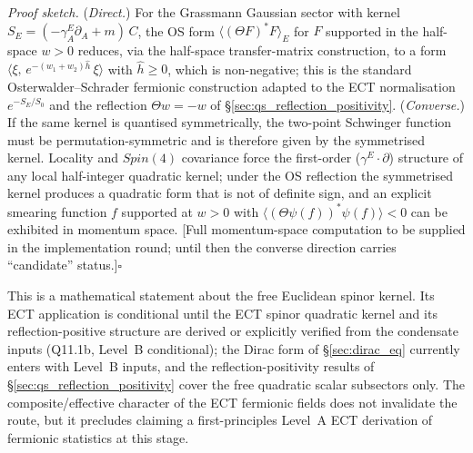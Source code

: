 \emph{Proof sketch.}
(\emph{Direct.})
For the Grassmann Gaussian sector with kernel
$S_E=(-\gamma^E_A\partial_A+m)\,C$, the OS form
$\langle(\Theta F)^{*}F\rangle_E$ for $F$ supported in the
half-space $w>0$ reduces, via the half-space transfer-matrix
construction, to a form
$\langle\xi,\,e^{-(w_1+w_2)\hat h}\,\xi\rangle$ with
$\hat h\ge 0$, which is non-negative; this is the standard
Osterwalder--Schrader fermionic construction adapted to the ECT
normalisation $e^{-S_E/S_0}$ and the reflection $\Theta w=-w$
of \S\ref{sec:qs_reflection_positivity}.
(\emph{Converse.})
If the same kernel is quantised symmetrically, the two-point
Schwinger function must be permutation-symmetric and is therefore
given by the symmetrised kernel.
Locality and $Spin(4)$ covariance force the first-order
($\gamma^E\!\cdot\!\partial$) structure of any local half-integer
quadratic kernel; under the OS reflection the symmetrised kernel
produces a quadratic form that is not of definite sign, and an
explicit smearing function $f$ supported at $w>0$ with
$\langle(\Theta\psi(f))^{*}\psi(f)\rangle<0$ can be exhibited in
momentum space.
[Full momentum-space computation to be supplied in the
implementation round; until then the converse direction carries
``candidate'' status.]\hfill$\square$

This is a mathematical statement about the free Euclidean spinor
kernel.
Its ECT application is conditional until the ECT spinor quadratic
kernel and its reflection-positive structure are derived or
explicitly verified from the condensate inputs
(Q11.1b, Level~B conditional); the Dirac form of
\S\ref{sec:dirac_eq} currently enters with Level~B inputs, and the
reflection-positivity results of
\S\ref{sec:qs_reflection_positivity} cover the free quadratic
scalar subsectors only.
The composite/effective character of the ECT fermionic fields does
not invalidate the route, but it precludes claiming a
first-principles Level~A ECT derivation of fermionic statistics at
this stage.


